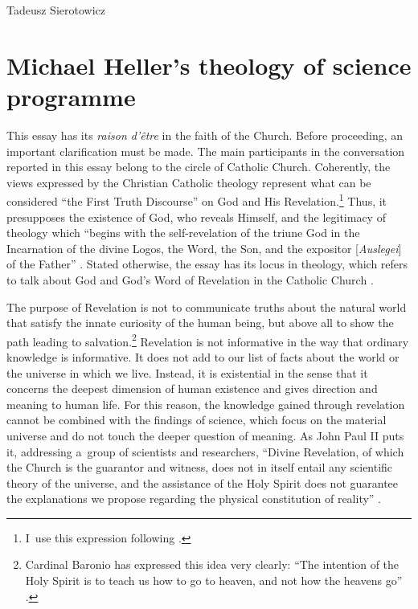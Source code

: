 \begin{artengenv}{Tadeusz Sierotowicz}
\section{Michael Heller's theology of science programme}

This essay has its \textit{raison d'être} in the faith of the Church. Before proceeding, an important clarification must be made. The main participants in the conversation reported in this essay belong to the circle of Catholic Church. Coherently, the views expressed by the Christian Catholic theology represent what can be considered ``the First Truth Discourse'' on God and His Revelation.\footnote{I~use this expression following 
\parencite[][pp.26–39]{tyson_christian_2022}. %
 } Thus, it presupposes the existence of God, who reveals Himself, and the legitimacy of theology which ``begins with the self-revelation of the triune God in the Incarnation of the divine Logos, the Word, the Son, and the expositor [\textit{Auslegei}] of the Father'' 
\parencite[][p.11]{balthasar_theo-logic_2004}. %
 Stated otherwise, the essay has its locus in theology, which refers to talk about God and God's Word of Revelation in the Catholic Church 
\parencite[an expressioof][p.2]{barth_church_2010}.%




The purpose of Revelation is not to communicate truths about the natural world that satisfy the innate curiosity of the human being, but above all to show the path leading to salvation.\footnote{Cardinal Baronio has expressed this idea very clearly: ``The intention of the Holy Spirit is to teach us how to go to heaven, and not how the heavens go'' 
\parencite[][p.185]{mcmullin_augustine_1999}. %
 } Revelation is not informative in the way that ordinary knowledge is informative. It does not add to our list of facts about the world or the universe in which we live. Instead, it is existential in the sense that it concerns the deepest dimension of human existence and gives direction and meaning to human life. For this reason, the knowledge gained through revelation cannot be combined with the findings of science, which focus on the material universe and do not touch the deeper question of meaning. As John Paul II puts it, addressing a~group of scientists and researchers, ``Divine Revelation, of which the Church is the guarantor and witness, does not in itself entail any scientific theory of the universe, and the assistance of the Holy Spirit does not guarantee the explanations we propose regarding the physical constitution of reality'' 
\parencite[][]{john_paul_ii_address_1983}.%





\end{artengenv}
